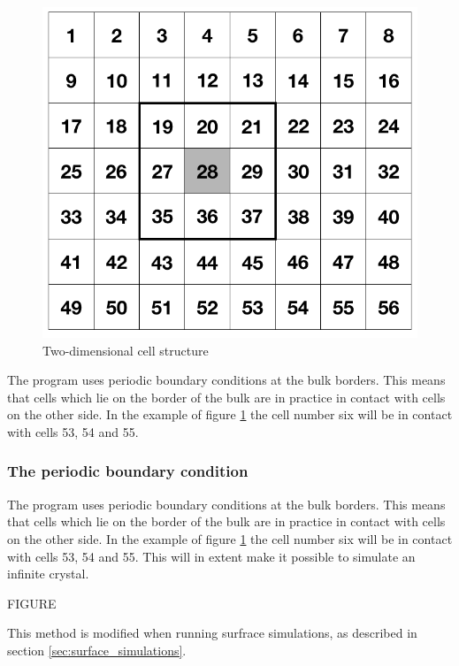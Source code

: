 \documentclass[12pt,a4paper]{article}
\begin{document}
\begin{figure}[h]
\begin{center}
\includegraphics[scale=0.4]{figs/cells.png}
\caption{\small Two-dimensional cell structure
\label{fig:cells}}
\end{center}
\end{figure}

The program uses periodic boundary conditions at the bulk borders. This means that cells which lie on the border of the bulk are in practice in contact with cells on the other side. In the example of figure \ref{fig:cells} the cell number six will be in contact with cells 53, 54 and 55. 


\subsubsection{The periodic boundary condition}
\label{sec:the_periodic_boundary_condition}
The program uses periodic boundary conditions at the bulk borders. This means that cells which lie on the border of the bulk are in practice in contact with cells on the other side. In the example of figure \ref{fig:cells} the cell number six will be in contact with cells 53, 54 and 55. This will in extent make it possible to simulate an infinite crystal.

FIGURE

This method is modified when running surfrace simulations, as described in section \ref{sec:surface_simulations}.
\end{document}

